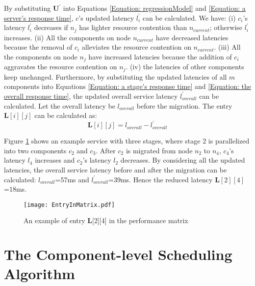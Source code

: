\documentclass[10pt, conference, compsocconf]{IEEEtran}
\begin{document}
By substituting $\textbf{U}^{'}$ into Equations \ref{Equation: regressionModel} and \ref{Equation: a server's response time}, $c$'s updated latency $l_i^{'}$ can be calculated. We have: (i) $c_{i}$'s latency $l_i^{'}$ decreases if $n_j$ has lighter resource contention than $n_{current}$; otherwise $l_i^{'}$ increases. (ii) All the components on node $n_{current}$ have decreased latencies because the removal of $c_{i}$ alleviates the resource contention on $n_{current}$. (iii) All the components on node $n_{j}$ have increased latencies because the addition of $c_{i}$ aggravates the resource contention on $n_{j}$. (iv) the latencies of other components keep unchanged. Furthermore, by substituting the updated latencies of all $m$ components into Equations \ref{Equation: a stage's response time} and \ref{Equation: the overall response time}, the updated overall service latency $l_{overall}^{'}$ can be calculated. Let the overall latency be $l_{overall}$ before the migration. The entry $\textbf{L}[i][j]$ can be calculated as:
\begin{equation}
\textbf{L}[i][j] = l_{overall} - l_{overall}^{'}
\label{Equation: changes in the overall response time}
\end{equation}



Figure \ref{Fig: EntryInMatrix} shows an example service with three stages, where stage 2 is parallelized into two components $c_2$ and $c_3$. After $c_2$ is migrated from node $n_2$ to $n_4$, $c_4$'s latency $l_4$ increases and $c_2$'s latency $l_2$ decreases. By considering all the updated latencies, the overall service latency before and after the migration can be calculated: $l_{overall}$=57ms and $l_{overall}^{'}$=39ms. Hence the reduced latency $\textbf{L}[2][4]$=18ms.

\begin{figure}
\centering
  \texttt{[image: EntryInMatrix.pdf]}\\
  \caption{An example of entry \textbf{L}[2][4] in the performance matrix}
  \label{Fig: EntryInMatrix}
\end{figure}



\section{The Component-level Scheduling Algorithm} \label{Section: Algorithm}
\end{document}
